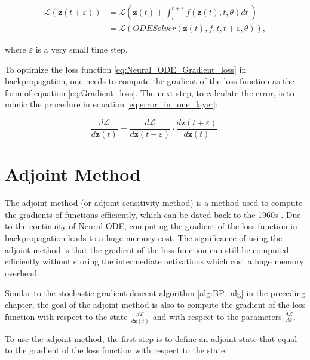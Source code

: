 \documentclass[
	parskip, 			   %
	twoside, 			   %
	DIV=14, 			   %
	BCOR=15.0mm, 		   %
	headsepline, 		   %
	open=right, 		   %
	captions=tableheading, %
	bibliography=totoc,    %
	numbers=noenddot       %
]{scrreprt}
\begin{document}
\begin{equation}
    \label{eq:Neural_ODE_Gradient_loss}
    \begin{aligned}
    \mathcal{L}(\mathbf{z}(t+\varepsilon )) &= \mathcal{L}(\mathbf{z}(t) + \int_{t}^{t+\varepsilon } f(\mathbf{z}(t), t, \theta)dt \:)\\
    &= \mathcal{L}(ODESolver(\mathbf{z}(t), f, t, t+\varepsilon , \theta)),
    \end{aligned}
\end{equation}

where $\varepsilon $ is a very small time step.

To optimize the loss function \ref{eq:Neural_ODE_Gradient_loss} in backpropagation, one needs to compute the gradient of the loss function as the form of equation \ref{eq:Gradient_loss}. The next step, to calculate the error, is to mimic the procedure in equation \ref{eq:error_in_one_layer}:

\begin{equation}
    \label{eq:Neural_ODE_error}
    \frac{d\mathcal{L}}{d\mathbf{z}(t)} = \frac{d\mathcal{L}}{d\mathbf{z}(t+\varepsilon )} \cdot \frac{d\mathbf{z}(t+\varepsilon )}{d\mathbf{z}(t)}.
\end{equation}

\section{Adjoint Method}
The adjoint method (or adjoint sensitivity method) is a method used to compute the gradients of functions efficiently, which can be dated back to the 1960s \cite{boltyanskiy1962mathematical}. Due to the continuity of Neural ODE, computing the gradient of the loss function in backpropagation leads to a huge memory cost. The significance of using the adjoint method is that the gradient of the loss function can still be computed efficiently without storing the intermediate activations which cost a huge memory overhead.

Similar to the stochastic gradient descent algorithm \ref{alg:BP_alg} in the preceding chapter, the goal of the adjoint method is also to compute the gradient of the loss function with respect to the state $\frac{d\mathcal{L}}{d\mathbf{z}(t)}$ and with respect to the parameters $\frac{d\mathcal{L}}{d\theta}$.

To use the adjoint method, the first step is to define an adjoint state that equal to the gradient of the loss function with respect to the state:
\end{document}
